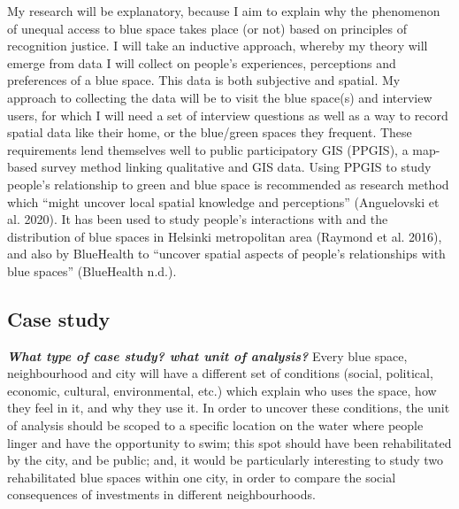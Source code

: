 \documentclass{article}
\newcommand{\bisection}[1]{\textbf{\textit{#1}}}
\begin{document}
My research will be explanatory, because I aim to explain why the phenomenon of unequal access to blue space takes place (or not) based on principles of recognition justice. I will take an inductive approach, whereby my theory will emerge from data I will collect on people’s experiences, perceptions and preferences of a blue space. This data is both subjective and spatial. My approach to collecting the data will be to visit the blue space(s) and interview users, for which I will need a set of interview questions as well as a way to record spatial data like their home, or the blue/green spaces they frequent. These requirements lend themselves well to public participatory GIS (PPGIS), a map-based survey method linking qualitative and GIS data. Using PPGIS to study people’s relationship to green and blue space is recommended as research method which “might uncover local spatial knowledge and perceptions” (Anguelovski et al. 2020). It has been used to study people’s interactions with and the distribution of blue spaces in Helsinki metropolitan area (Raymond et al. 2016), and also by BlueHealth to “uncover spatial aspects of people’s relationships with blue spaces” (BlueHealth n.d.).

\subsection{Case study} 

\bisection{What type of case study? what unit of analysis?}
Every blue space, neighbourhood and city will have a different set of conditions (social, political, economic, cultural, environmental, etc.) which explain who uses the space, how they feel in it, and why they use it. In order to uncover these conditions, the unit of analysis should be scoped to a specific location on the water where people linger and have the opportunity to swim; this spot should have been rehabilitated by the city, and be public; and, it would be particularly interesting to study two rehabilitated blue spaces within one city, in order to compare the social consequences of investments in different neighbourhoods.
\end{document}
